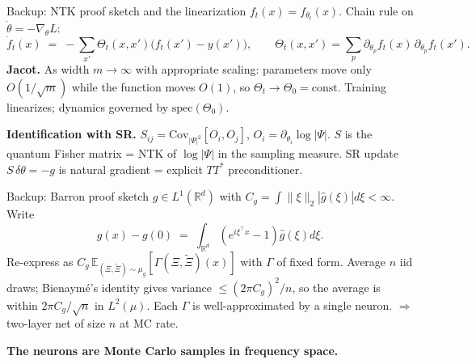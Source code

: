 \documentclass[10pt,aspectratio=169]{beamer}
\begin{document}
\appendix

\begin{frame}{Backup: NTK proof sketch and the linearization}
\small
$f_t(x)=f_{\theta_t}(x)$. Chain rule on $\dot\theta=-\nabla_\theta L$:
\[
  \dot f_t(x) \;=\; -\!\sum_{x'}\!\Theta_t(x,x')\bigl(f_t(x')-y(x')\bigr),\qquad
  \Theta_t(x,x')=\sum_p \partial_{\theta_p}\!f_t(x)\,\partial_{\theta_p}\!f_t(x').
\]
\textbf{Jacot.} As width $m\!\to\!\infty$ with appropriate scaling: parameters move only
$O(1/\sqrt m)$ while the function moves $O(1)$, so $\Theta_t\to\Theta_0=\text{const}$. Training
linearizes; dynamics governed by $\mathrm{spec}(\Theta_0)$.

\vspace{4pt}
\textbf{Identification with SR.} $S_{ij}=\mathrm{Cov}_{|\Psi|^2}[O_i,O_j]$, $O_i=\partial_{\theta_i}\log|\Psi|$.
$S$ is the quantum Fisher matrix = NTK of $\log|\Psi|$ in the sampling measure. SR update
$S\,\delta\theta=-g$ is natural gradient = explicit $TT^\ast$ preconditioner.
\end{frame}

\begin{frame}{Backup: Barron proof sketch}
\small
$g\in L^1(\mathbb R^d)$ with $C_g=\int\|\xi\|_2|\hat g(\xi)|d\xi<\infty$. Write
\[
  g(x)-g(0) \;=\; \int_{\mathbb R^d}(e^{i\xi^\top x}-1)\hat g(\xi)d\xi.
\]
Re-express as $C_g\,\mathbb E_{(\Xi,\tilde\Xi)\sim\mu_g}[\Gamma(\Xi,\tilde\Xi)(x)]$ with $\Gamma$
of fixed form. Average $n$ iid draws; Bienaymé's identity gives variance $\le (2\pi C_g)^2/n$, so the
average is within $2\pi C_g/\sqrt n$ in $L^2(\mu)$. Each $\Gamma$ is well-approximated by a single
neuron. $\Rightarrow$ two-layer net of size $n$ at MC rate.

\vspace{4pt}
\centering\colorbox{papA!10}{\parbox{0.78\linewidth}{\centering\small \textbf{The neurons are
Monte Carlo samples in frequency space.}}}
\end{frame}
\end{document}
